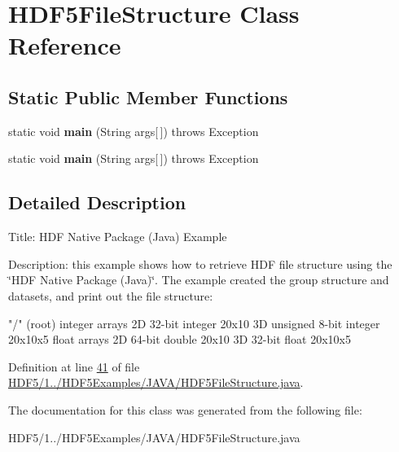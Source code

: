 \hypertarget{class_h_d_f5_file_structure}{}\section{H\+D\+F5\+File\+Structure Class Reference}
\label{class_h_d_f5_file_structure}
\subsection*{Static Public Member Functions}
\begin{DoxyCompactItemize}
\item 
\mbox{\label{class_h_d_f5_file_structure_a9d94dd6b956a8c70ce9211a70711d78b}} 
static void {\bfseries main} (String args\mbox{[}$\,$\mbox{]})  throws Exception 
\item 
\mbox{\label{class_h_d_f5_file_structure_a9d94dd6b956a8c70ce9211a70711d78b}} 
static void {\bfseries main} (String args\mbox{[}$\,$\mbox{]})  throws Exception 
\end{DoxyCompactItemize}


\subsection{Detailed Description}
Title\+: H\+DF Native Package (Java) Example 

Description\+: this example shows how to retrieve H\+DF file structure using the \char`\"{}\+H\+D\+F Native Package (\+Java)\char`\"{}. The example created the group structure and datasets, and print out the file structure\+:


\begin{DoxyPre}
    "/" (root)
        integer arrays
            2D 32-bit integer 20x10
            3D unsigned 8-bit integer 20x10x5
        float arrays
            2D 64-bit double 20x10
            3D 32-bit float  20x10x5
\end{DoxyPre}


Definition at line \hyperlink{_h_d_f5_21_810_81_2_h_d_f5_examples_2_j_a_v_a_2_h_d_f5_file_structure_8java_source_l00041}{41} of file \hyperlink{_h_d_f5_21_810_81_2_h_d_f5_examples_2_j_a_v_a_2_h_d_f5_file_structure_8java_source}{H\+D\+F5/1../\+H\+D\+F5\+Examples/\+J\+A\+V\+A/\+H\+D\+F5\+File\+Structure.\+java}.



The documentation for this class was generated from the following file\+:\begin{DoxyCompactItemize}
\item 
H\+D\+F5/1../\+H\+D\+F5\+Examples/\+J\+A\+V\+A/\+H\+D\+F5\+File\+Structure.\+java\end{DoxyCompactItemize}
